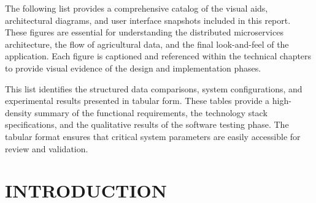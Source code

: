\documentclass[12pt,a4paper]{report}
\begin{document}
\begin{center}
\begin{tcolorbox}[colback=white,colframe=black,title=\textbf{LIST OF FIGURES}, boxrule=1pt, sharp corners]
    \vspace{0.5cm}
    \begin{minipage}{0.9\textwidth}
    The following list provides a comprehensive catalog of the visual aids, architectural diagrams, and user interface snapshots included in this report. These figures are essential for understanding the distributed microservices architecture, the flow of agricultural data, and the final look-and-feel of the application. Each figure is captioned and referenced within the technical chapters to provide visual evidence of the design and implementation phases.
    \end{minipage}
    \vspace{0.5cm}
    \renewcommand{\listfigurename}{\vspace{-1.5cm}}
    \listoffigures
\end{tcolorbox}
\end{center}
\newpage

\begin{center}
\begin{tcolorbox}[colback=white,colframe=black,title=\textbf{LIST OF TABLES}, boxrule=1pt, sharp corners]
    \vspace{0.5cm}
    \begin{minipage}{0.9\textwidth}
    This list identifies the structured data comparisons, system configurations, and experimental results presented in tabular form. These tables provide a high-density summary of the functional requirements, the technology stack specifications, and the qualitative results of the software testing phase. The tabular format ensures that critical system parameters are easily accessible for review and validation.
    \end{minipage}
    \vspace{0.5cm}
    \renewcommand{\listtablename}{\vspace{-1.5cm}}
    \listoftables
\end{tcolorbox}
\end{center}
\newpage

\chapter{INTRODUCTION}
\label{ch:1}
\end{document}
